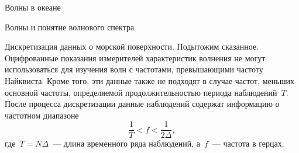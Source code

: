 \begin{chapter}{Волны в океане}
\begin{section}{Волны и понятие волнового спектра}
\begin{paragraph}{Дискретизация данных о морской поверхности.}
Подытожим сказанное. Оцифрованные показания измерителей характеристик 
волнения не могут использоваться для изучения волн с частотами, превышающими
частоту Найквиста. Кроме того, эти данные также не подходят в случае
частот, меньших основной частоты, определяемой продолжительностью
периода наблюдений~$T$. После процесса дискретизации данные наблюдений
содержат информацию о частотном диапазоне
\begin{equation}
 \frac{1}{T} < f < \frac{1}{2 \Delta},
\end{equation}
где~$T = N \Delta$~--- длина временного ряда наблюдений, а~$f$~--- частота
в герцах.
%
\end{paragraph}


\end{section}
\end{chapter}
